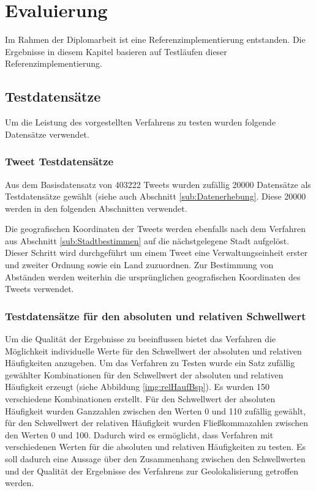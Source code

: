 \chapter{Evaluierung} 

	Im Rahmen der Diplomarbeit ist eine Referenzimplementierung entstanden.
	Die Ergebnisse in diesem Kapitel basieren auf Testläufen dieser Referenzimplementierung.

	\section{Testdatensätze}

		Um die Leistung des vorgestellten Verfahrens zu testen wurden folgende Datensätze verwendet. 

		\subsection{Tweet Testdatensätze}

			Aus dem Basisdatensatz von 403222 Tweets wurden zufällig 20000 Datensätze als Testdatensätze gewählt (siehe auch Abschnitt \ref{sub:Datenerhebung}. 
			Diese 20000 werden in den folgenden Abschnitten verwendet.
			
			Die geografischen Koordinaten der Tweets werden ebenfalls nach dem Verfahren aus Abschnitt \ref{sub:Stadtbestimmen} auf die nächstgelegene Stadt aufgelöst.
			Dieser Schritt wird durchgeführt um einem Tweet eine Verwaltungseinheit erster und zweiter Ordnung sowie ein Land zuzuordnen.
			Zur Bestimmung von Abständen werden weiterhin die ursprünglichen geografischen Koordinaten des Tweets verwendet.  

		\subsection{Testdatensätze für den absoluten und relativen Schwellwert} \label{sub:schwellwerteDatensatz} 

			Um die Qualität der Ergebnisse zu beeinflussen bietet das Verfahren die Möglichkeit individuelle Werte für den Schwellwert der absoluten und relativen Häufigkeiten anzugeben.
			Um das Verfahren zu Testen wurde ein Satz zufällig gewählter Kombinationen für den Schwellwert der absoluten und relativen Häufigkeit erzeugt (siehe Abbildung \ref{img:relHaufBsp}).
			Es wurden 150 verschiedene Kombinationen erstellt.
			Für den Schwellwert der absoluten Häufigkeit wurden Ganzzahlen zwischen den Werten 0 und 110 zufällig gewählt, für den Schwellwert der relativen Häufigkeit wurden Fließkommazahlen zwischen den Werten 0 und 100.
			Dadurch wird es ermöglicht, dass Verfahren mit verschiedenen Werten für die absoluten und relativen Häufigkeiten zu testen.
			Es soll dadurch eine Aussage über den Zusammenhang zwischen den Schwellwerten und der Qualität der Ergebnisse des Verfahrens zur Geolokalisierung getroffen werden.


